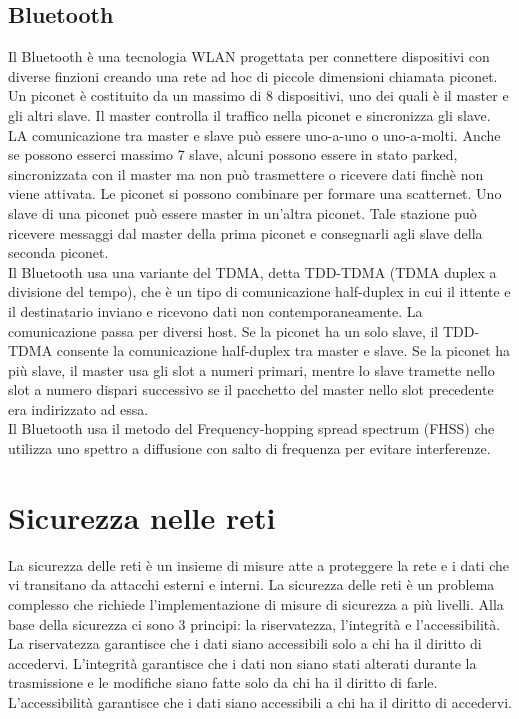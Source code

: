 \documentclass[12pt]{report}
\begin{document}
\section{Bluetooth}
Il Bluetooth è una tecnologia WLAN progettata per connettere dispositivi con diverse finzioni creando una rete ad hoc di piccole dimensioni chiamata piconet. Un piconet è costituito da un massimo di 8 dispositivi, uno dei quali è il master e gli altri slave. Il master controlla il traffico nella piconet e sincronizza gli slave. LA comunicazione tra master e slave può essere uno-a-uno o uno-a-molti. Anche se possono esserci massimo 7 slave, alcuni possono essere in stato parked, sincronizzata con il master ma non può trasmettere o ricevere dati finchè non viene attivata. Le piconet si possono combinare per formare una scatternet. Uno slave di una piconet può essere master in un'altra piconet. Tale stazione può ricevere messaggi dal master della prima piconet e consegnarli agli slave della seconda piconet.
\vspace{\baselineskip}\\
Il Bluetooth usa una variante del TDMA, detta TDD-TDMA (TDMA duplex a divisione del tempo), che è un tipo di comunicazione half-duplex in cui il ittente e il destinatario inviano e ricevono dati non contemporaneamente. La comunicazione passa per diversi host. Se la piconet ha un solo slave, il TDD-TDMA consente la comunicazione half-duplex tra master e slave. Se la piconet ha più slave, il master usa gli slot a numeri primari, mentre lo slave tramette nello slot a numero dispari successivo se il pacchetto del master nello slot precedente era indirizzato ad essa.
\vspace{\baselineskip}\\
Il Bluetooth usa il metodo del Frequency-hopping spread spectrum (FHSS) che utilizza uno spettro a diffusione con salto di frequenza per evitare interferenze.


\chapter{Sicurezza nelle reti}
La sicurezza delle reti è un insieme di misure atte a proteggere la rete e i dati che vi transitano da attacchi esterni e interni. La sicurezza delle reti è un problema complesso che richiede l'implementazione di misure di sicurezza a più livelli. Alla base della sicurezza ci sono 3 principi: la riservatezza, l'integrità e l'accessibilità. La riservatezza garantisce che i dati siano accessibili solo a chi ha il diritto di accedervi. L'integrità garantisce che i dati non siano stati alterati durante la trasmissione e le modifiche siano fatte solo da chi ha il diritto di farle. L'accessibilità garantisce che i dati siano accessibili a chi ha il diritto di accedervi.
\end{document}
